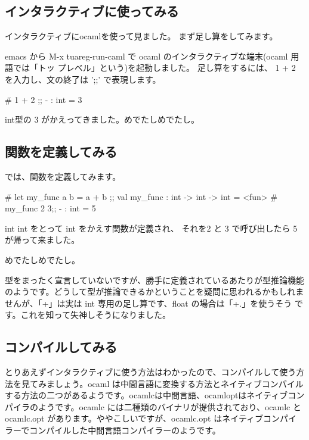 \documentclass[mingoth,a4paper]{jsarticle}
\begin{document}
\subsection{インタラクティブに使ってみる}

インタラクティブにocamlを使って見ました。
まず足し算をしてみます。

emacs から M-x tuareg-run-caml で ocaml のインタラクティブな端末(ocaml 用語では「トッ
プレベル」という)を起動しました。
足し算をするには、 1 + 2 を入力し、文の終了は ';;' で表現します。

\begin{commandline}
# 1 + 2 ;;
- : int = 3
\end{commandline}

int型の 3 がかえってきました。めでたしめでたし。

\subsection{関数を定義してみる}

では、関数を定義してみます。

\begin{commandline}
# let my_func a b = a + b ;;
val my_func : int -> int -> int = <fun>
# my_func 2 3;;
- : int = 5
\end{commandline}

int int をとって int をかえす関数が定義され、
それを2 と 3 で呼び出したら 5 が帰って来ました。

めでたしめでたし。

型をまったく宣言していないですが、勝手に定義されているあたりが型推論機能
のようです。どうして型が推論できるかということを疑問に思われるかもしれま
せんが、「+」は実は int 専用の足し算です、float の場合は「+.」を使うそう
です。これを知って失神しそうになりました。

\subsection{コンパイルしてみる}

とりあえずインタラクティブに使う方法はわかったので、コンパイルして使う方
法を見てみましょう。ocaml は中間言語に変換する方法とネイティブコンパイル
する方法の二つがあるようです。ocamlcは中間言語、ocamloptはネイティブコン
パイラのようです。ocamlc には二種類のバイナリが提供されており、ocamlc と
ocamlc.opt があります。ややこしいですが、ocamlc.opt はネイティブコンパイ
ラーでコンパイルした中間言語コンパイラーのようです。
\end{document}
